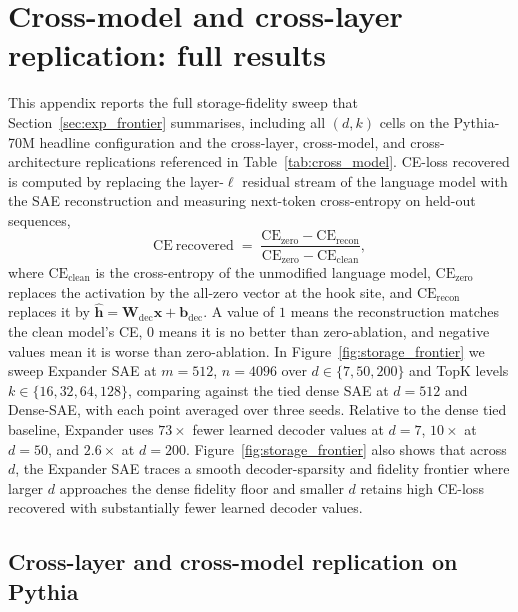 \documentclass{article}
\theoremstyle{plain}
\theoremstyle{definition}
\theoremstyle{remark}
\begin{document}
\section{Cross-model and cross-layer replication: full results}
\label{app:cross_model_full}

This appendix reports the full storage-fidelity sweep that Section~\ref{sec:exp_frontier} summarises, including all $(d, k)$ cells on the Pythia-70M headline configuration and the cross-layer, cross-model, and cross-architecture replications referenced in Table~\ref{tab:cross_model}. CE-loss recovered is computed by replacing the layer-$\ell$ residual stream of the language model with the SAE reconstruction and measuring next-token cross-entropy on held-out sequences,
\begin{equation}
    \label{eq:ce-recovered}
    \mathrm{CE\ recovered}
    \;=\;
    \frac{
        \mathrm{CE}_{\mathrm{zero}}-\mathrm{CE}_{\mathrm{recon}}
    }{
        \mathrm{CE}_{\mathrm{zero}}-\mathrm{CE}_{\mathrm{clean}}
    },
\end{equation}
where $\mathrm{CE}_{\mathrm{clean}}$ is the cross-entropy of the unmodified language model, $\mathrm{CE}_{\mathrm{zero}}$ replaces the activation by the all-zero vector at the hook site, and $\mathrm{CE}_{\mathrm{recon}}$ replaces it by $\hat{\mathbf{h}} = \mathbf{W}_{\mathrm{dec}}\mathbf{x} + \mathbf{b}_{\mathrm{dec}}$. A value of $1$ means the reconstruction matches the clean model's CE, $0$ means it is no better than zero-ablation, and negative values mean it is worse than zero-ablation. In Figure~\ref{fig:storage_frontier} we sweep Expander SAE at $m{=}512$, $n{=}4096$ over $d \in \{7, 50, 200\}$ and TopK levels $k \in \{16, 32, 64, 128\}$, comparing against the tied dense SAE at $d{=}512$ and Dense-SAE, with each point averaged over three seeds. Relative to the dense tied baseline, Expander uses $73\times$ fewer learned decoder values at $d{=}7$, $10\times$ at $d{=}50$, and $2.6\times$ at $d{=}200$. Figure~\ref{fig:storage_frontier} also shows that across $d$, the Expander SAE traces a smooth decoder-sparsity and fidelity frontier where larger $d$ approaches the dense fidelity floor and smaller $d$ retains high CE-loss recovered with substantially fewer learned decoder values.

\subsection{Cross-layer and cross-model replication on Pythia}
\end{document}

